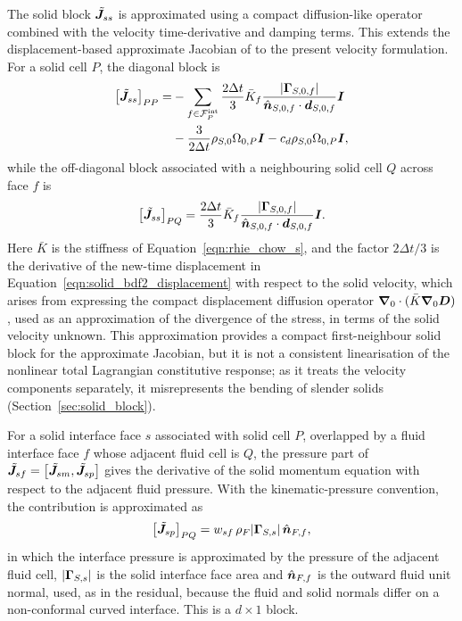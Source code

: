 The solid block $\tilde{\boldsymbol{J}}_{ss}$ is approximated using a compact
diffusion-like operator combined with the velocity time-derivative and damping
terms. This extends the displacement-based approximate Jacobian of
\citet{Cardiff2026} to the present velocity formulation. For a solid cell $P$,
the diagonal block is
\begin{align}
    \left[\tilde{\boldsymbol{J}}_{ss}\right]_{PP}
    =
    &-
    \sum_{f \in \mathcal{F}^{\mathrm{int}}_P}
    \frac{2\Delta t}{3}
    \bar{K}_f
    \frac{|\boldsymbol{\Gamma}_{S,0,f}|}
         {\hat{\boldsymbol{n}}_{S,0,f} \cdot \boldsymbol{d}_{S,0,f}}
    \boldsymbol{I}
    \notag \\
    &-
    \frac{3}{2\Delta t}
    \rho_{S,0} \Omega_{0,P}
    \boldsymbol{I}
    -
    c_d \rho_{S,0} \Omega_{0,P}
    \boldsymbol{I},
    \label{eqn:Jss_diag}
\end{align}
while the off-diagonal block associated with a neighbouring solid cell $Q$
across face $f$ is
\begin{equation}
    \left[\tilde{\boldsymbol{J}}_{ss}\right]_{PQ}
    =
    \frac{2\Delta t}{3}
    \bar{K}_f
    \frac{|\boldsymbol{\Gamma}_{S,0,f}|}
         {\hat{\boldsymbol{n}}_{S,0,f} \cdot \boldsymbol{d}_{S,0,f}}
    \boldsymbol{I}.
    \label{eqn:Jss_offdiag}
\end{equation}
Here $\bar{K}$ is the stiffness of Equation~\eqref{eqn:rhie_chow_s}, and the
factor $2\Delta t/3$ is the derivative of the new-time displacement in
Equation~\eqref{eqn:solid_bdf2_displacement} with respect to the solid
velocity, which arises from expressing the compact displacement
diffusion operator $\boldsymbol{\nabla}_0\cdot(\bar{K}\boldsymbol{\nabla}_0\boldsymbol{D})$, used as an
approximation of the divergence of the stress, in terms of the solid velocity
unknown.
This approximation provides a compact first-neighbour solid block for the
approximate Jacobian, but it is not a consistent linearisation of the nonlinear
total Lagrangian constitutive response; as it treats the velocity components
separately, it misrepresents the bending of slender solids
(Section~\ref{sec:solid_block}).

For a solid interface face $s$ associated with solid cell $P$, overlapped by a
fluid interface face $f$ whose adjacent fluid cell is $Q$, the pressure part of
$\tilde{\boldsymbol{J}}_{sf}
=
\left[\tilde{\boldsymbol{J}}_{sm},\tilde{\boldsymbol{J}}_{sp}\right]$
gives the derivative of the solid momentum equation with respect to the
adjacent fluid pressure. With the kinematic-pressure convention, the
contribution is approximated as
\begin{equation}
    \left[\tilde{\boldsymbol{J}}_{sp}\right]_{P Q}
    =
    w_{sf}\, \rho_F |\boldsymbol{\Gamma}_{S,s}|\, \hat{\boldsymbol{n}}_{F,f},
    \label{eqn:pressure_coupling_approximation}
\end{equation}
in which the interface pressure is approximated by the pressure of the adjacent
fluid cell, $|\boldsymbol{\Gamma}_{S,s}|$ is the solid interface face area and
$\hat{\boldsymbol{n}}_{F,f}$ is the outward fluid unit normal, used, as in the residual,
because the fluid and solid normals differ on a non-conformal curved interface.
This is a $d\times 1$ block.

